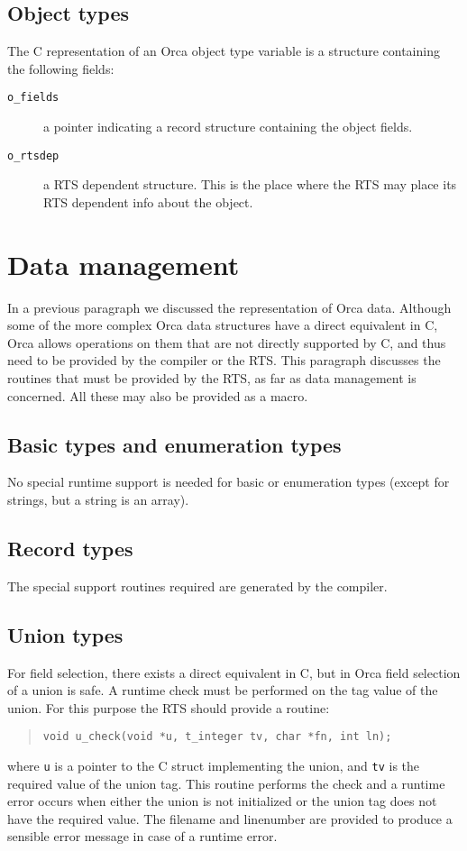 \documentclass[10pt]{article}
\begin{document}
\subsection{Object types}
The C representation of an Orca object type variable is a structure
containing the following fields:
\begin{description}
\item[{\tt o\_fields}]
a pointer indicating a record structure containing the object fields.
\item[{\tt o\_rtsdep}]
a RTS dependent structure.
This is the place where the RTS may place its RTS dependent info
about the object.
\end{description}

\section{Data management}\label{sec:dataman}
In a previous paragraph we discussed the representation of Orca data.
Although some of the more complex Orca data structures have a direct
equivalent in C, Orca allows operations on them that are not
directly supported by C,
and thus need to be provided by the compiler or the RTS.
This paragraph discusses the routines that must be provided by the
RTS, as far as data management is concerned.
All these may also be provided as a macro.

\subsection{Basic types and enumeration types}
No special runtime support is needed for basic or enumeration types
(except for strings, but a string is an array).

\subsection{Record types}
The special support routines required are generated by the compiler.

\subsection{Union types}
For field selection, there exists
a direct equivalent in C, but in Orca field selection of a union is
safe.
A runtime check must be performed on the tag value of the union.
For this purpose the RTS should provide a routine:
\begin{quote}
\begin{verbatim}
void u_check(void *u, t_integer tv, char *fn, int ln);
\end{verbatim}
\end{quote}
where \verb+u+ is a pointer to the C struct implementing the union,
and \verb+tv+ is the required value of the union tag.
This routine performs the check and a runtime error occurs when either
the union is not initialized or the union tag does not have the
required value.
The filename and linenumber are provided to produce a sensible error message
in case of a runtime error.
\end{document}
